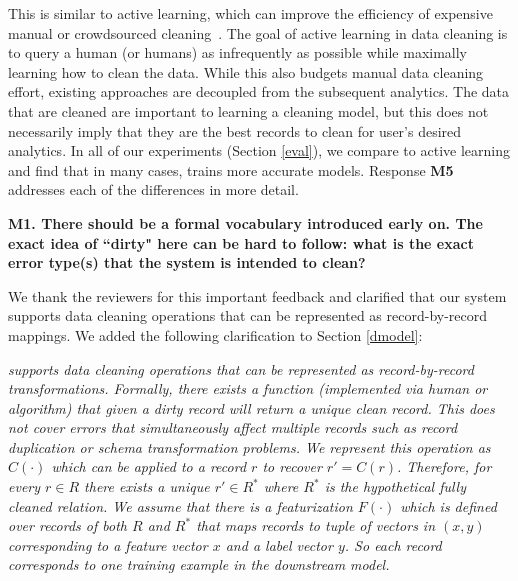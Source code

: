 This is similar to active learning, which can improve the efficiency of expensive manual or crowdsourced cleaning~\cite{gokhale2014corleone, DBLP:journals/pvldb/MozafariSFJM14, DBLP:journals/pvldb/YakoutENOI11}.
The goal of active learning in data cleaning is to query a human (or humans) as infrequently as possible while maximally learning how to clean the data.
While this also budgets manual data cleaning effort, existing approaches are decoupled from the subsequent analytics.
The data that are cleaned are important to learning a cleaning model, but this does not necessarily imply that they are the best records to clean for user's desired analytics.
In all of our experiments (Section \ref{eval}), we compare to active learning and find that in many cases, \sys trains more accurate models.
Response \textbf{M5} addresses each of the differences in more detail.

\vspace{0.5em}

\noindent\noindent \textbf{M1. There should be a formal vocabulary introduced early on. The exact idea of ``dirty" here can be hard to follow: what is the exact error type(s) that the system is intended to clean?}

\vspace{0.5em}

We thank the reviewers for this important feedback and clarified that our system supports data cleaning operations that can be represented as record-by-record mappings.
We added the following clarification to Section \ref{dmodel}:

\emph{\sys supports data cleaning operations that can be represented as record-by-record transformations.
Formally, there exists a function (implemented via human or algorithm) that given a dirty record will return a unique clean record.
This does not cover errors that simultaneously affect multiple records such as record duplication or schema transformation problems.
We represent this operation as $C(\cdot)$ which can be applied to a record $r$ to recover $r' = C(r)$.
Therefore, for every $r \in R$ there exists a unique $r' \in R^*$ where $R^*$ is the hypothetical fully cleaned relation.
We assume that there is a featurization $F(\cdot)$ which is defined over records of both $R$ and $R^*$ that maps records to tuple of vectors in $(x, y)$ corresponding to a feature vector $x$ and a label vector $y$.
So each record corresponds to one training example in the downstream model.}

